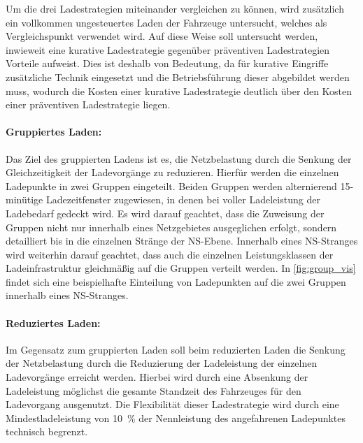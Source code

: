 Um die drei Ladestrategien miteinander vergleichen zu können, wird zusätzlich ein vollkommen ungesteuertes Laden der Fahrzeuge untersucht, welches als Vergleichspunkt verwendet wird.
Auf diese Weise soll untersucht werden, inwieweit eine kurative Ladestrategie gegenüber präventiven Ladestrategien Vorteile aufweist.
Dies ist deshalb von Bedeutung, da für kurative Eingriffe zusätzliche Technik eingesetzt und die  Betriebsführung dieser abgebildet werden muss, wodurch die Kosten einer kurative Ladestrategie deutlich über den Kosten einer präventiven Ladestrategie liegen.


\paragraph{Gruppiertes Laden:}

Das Ziel des gruppierten Ladens ist es, die Netzbelastung durch die Senkung der Gleichzeitigkeit der Ladevorgänge zu reduzieren.
Hierfür werden die einzelnen Ladepunkte in zwei Gruppen eingeteilt.
Beiden Gruppen werden alternierend 15-minütige Ladezeitfenster zugewiesen, in denen bei voller Ladeleistung der Ladebedarf gedeckt wird.
Es wird darauf geachtet, dass die Zuweisung der Gruppen nicht nur innerhalb eines Netzgebietes ausgeglichen erfolgt, sondern detailliert bis in die einzelnen Stränge der \gls{NS}-Ebene.
Innerhalb eines \gls{NS}-Stranges wird weiterhin darauf geachtet, dass auch die einzelnen Leistungsklassen der Ladeinfrastruktur gleichmäßig auf die Gruppen verteilt werden.
In \autoref{fig:group_vis} findet sich eine beispielhafte Einteilung von Ladepunkten auf die zwei Gruppen innerhalb eines \gls{NS}-Stranges.




\paragraph{Reduziertes Laden:}

Im Gegensatz zum gruppierten Laden soll beim reduzierten Laden die Senkung der Netzbelastung durch die Reduzierung der Ladeleistung der einzelnen Ladevorgänge erreicht werden.
Hierbei wird durch eine Absenkung der Ladeleistung möglichst die gesamte Standzeit des Fahrzeuges für den Ladevorgang ausgenutzt.
Die Flexibilität dieser Ladestrategie wird durch eine Mindestladeleistung von \SI{10}{\percent} der Nennleistung des angefahrenen Ladepunktes technisch begrenzt.



